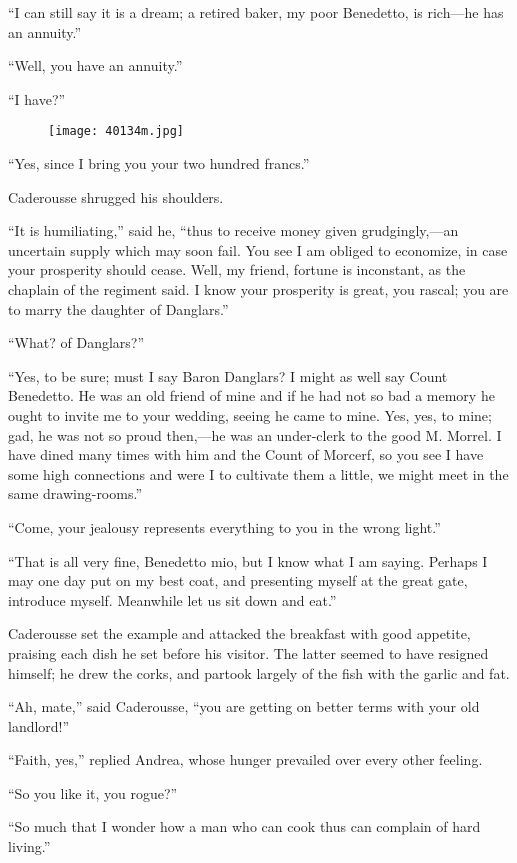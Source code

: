 “I can still say it is a dream; a retired baker, my poor Benedetto, is
rich—he has an annuity.”

“Well, you have an annuity.”

“I have?”

\begin{figure}[ht]
\texttt{[image: 40134m.jpg]}
\end{figure}

“Yes, since I bring you your two hundred francs.”

Caderousse shrugged his shoulders.

“It is humiliating,” said he, “thus to receive money given
grudgingly,—an uncertain supply which may soon fail. You see I am
obliged to economize, in case your prosperity should cease. Well, my
friend, fortune is inconstant, as the chaplain of the regiment said. I
know your prosperity is great, you rascal; you are to marry the
daughter of Danglars.”

“What? of Danglars?”

“Yes, to be sure; must I say Baron Danglars? I might as well say Count
Benedetto. He was an old friend of mine and if he had not so bad a
memory he ought to invite me to your wedding, seeing he came to mine.
Yes, yes, to mine; gad, he was not so proud then,—he was an under-clerk
to the good M. Morrel. I have dined many times with him and the Count
of Morcerf, so you see I have some high connections and were I to
cultivate them a little, we might meet in the same drawing-rooms.”

“Come, your jealousy represents everything to you in the wrong light.”

“That is all very fine, Benedetto mio, but I know what I am saying.
Perhaps I may one day put on my best coat, and presenting myself at the
great gate, introduce myself. Meanwhile let us sit down and eat.”

Caderousse set the example and attacked the breakfast with good
appetite, praising each dish he set before his visitor. The latter
seemed to have resigned himself; he drew the corks, and partook largely
of the fish with the garlic and fat.

“Ah, mate,” said Caderousse, “you are getting on better terms with your
old landlord!”

“Faith, yes,” replied Andrea, whose hunger prevailed over every other
feeling.

“So you like it, you rogue?”

“So much that I wonder how a man who can cook thus can complain of hard
living.”

